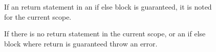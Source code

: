 \begin{figure}[H]
\centering
{}
\caption{If an return statement in an if else block is guaranteed, it is noted for the current scope.} 
\label{lf05}
\end{figure}

 \begin{figure}[H]
\centering
{}
\caption{If there is no return statement in the current scope, or an if else block where return is guaranteed throw an error.}
\label{lf05}
\end{figure}


